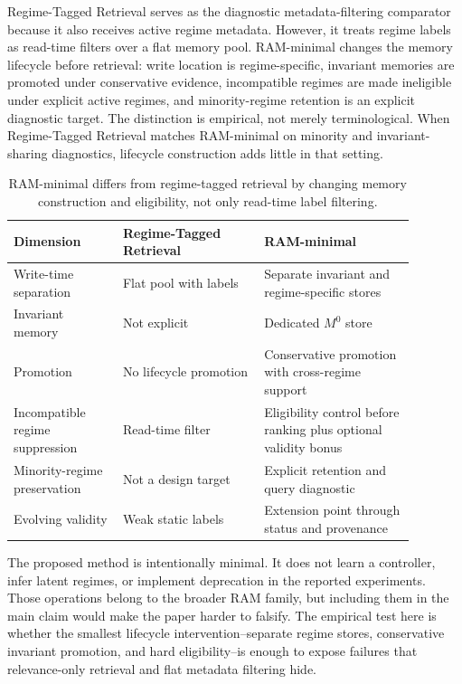 \documentclass{article} %
\begin{document}
Regime-Tagged Retrieval serves as the diagnostic metadata-filtering comparator because it also receives active regime metadata.
However, it treats regime labels as read-time filters over a flat memory pool.
RAM-minimal changes the memory lifecycle before retrieval: write location is regime-specific, invariant memories are promoted under conservative evidence, incompatible regimes are made ineligible under explicit active regimes, and minority-regime retention is an explicit diagnostic target.
The distinction is empirical, not merely terminological.
When Regime-Tagged Retrieval matches RAM-minimal on minority and invariant-sharing diagnostics, lifecycle construction adds little in that setting.

\begin{table}[t]
\centering
\footnotesize
\begin{tabular}{p{0.24\linewidth} p{0.31\linewidth} p{0.33\linewidth}}
\toprule
\textbf{Dimension} & \textbf{Regime-Tagged Retrieval} & \textbf{RAM-minimal} \\
\midrule
Write-time separation & Flat pool with labels & Separate invariant and regime-specific stores \\
\midrule
Invariant memory & Not explicit & Dedicated $M^0$ store \\
\midrule
Promotion & No lifecycle promotion & Conservative promotion with cross-regime support \\
\midrule
Incompatible regime suppression & Read-time filter & Eligibility control before ranking plus optional validity bonus \\
\midrule
Minority-regime preservation & Not a design target & Explicit retention and query diagnostic \\
\midrule
Evolving validity & Weak static labels & Extension point through status and provenance \\
\bottomrule
\end{tabular}
\caption{RAM-minimal differs from regime-tagged retrieval by changing memory construction and eligibility, not only read-time label filtering.}
\label{tab:ram_vs_tagged}
\end{table}

The proposed method is intentionally minimal.
It does not learn a controller, infer latent regimes, or implement deprecation in the reported experiments.
Those operations belong to the broader RAM family, but including them in the main claim would make the paper harder to falsify.
The empirical test here is whether the smallest lifecycle intervention--separate regime stores, conservative invariant promotion, and hard eligibility--is enough to expose failures that relevance-only retrieval and flat metadata filtering hide.
\end{document}
